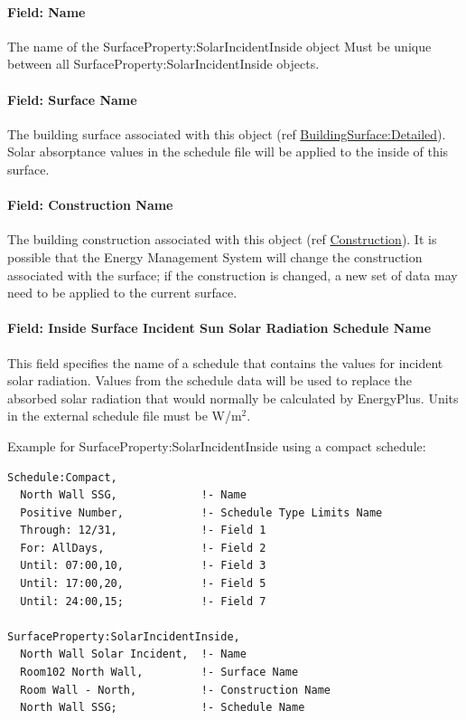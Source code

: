 \paragraph{Field: Name}\label{field-name-10}

The name of the SurfaceProperty:SolarIncidentInside object Must be unique between all SurfaceProperty:SolarIncidentInside objects.

\paragraph{Field: Surface Name}\label{field-surface-name-4}

The building surface associated with this object (ref \hyperref[buildingsurfacedetailed]{BuildingSurface:Detailed}). Solar absorptance values in the schedule file will be applied to the inside of this surface.

\paragraph{Field: Construction Name}\label{field-construction-name-1}

The building construction associated with this object (ref \hyperref[construction-000]{Construction}). It is possible that the Energy Management System will change the construction associated with the surface; if the construction is changed, a new set of data may need to be applied to the current surface.

\paragraph{Field: Inside Surface Incident Sun Solar Radiation Schedule Name}\label{field-inside-surface-incident-sun-solar-radiation-schedule-name}

This field specifies the name of a schedule that contains the values for incident solar radiation. Values from the schedule data will be used to replace the absorbed solar radiation that would normally be calculated by EnergyPlus. Units in the external schedule file must be W/m\(^{2}\).

Example for SurfaceProperty:SolarIncidentInside using a compact schedule:

\begin{lstlisting}
Schedule:Compact,
  North Wall SSG,             !- Name
  Positive Number,            !- Schedule Type Limits Name
  Through: 12/31,             !- Field 1
  For: AllDays,               !- Field 2
  Until: 07:00,10,            !- Field 3
  Until: 17:00,20,            !- Field 5
  Until: 24:00,15;            !- Field 7

SurfaceProperty:SolarIncidentInside,
  North Wall Solar Incident,  !- Name
  Room102 North Wall,         !- Surface Name
  Room Wall - North,          !- Construction Name
  North Wall SSG;             !- Schedule Name
\end{lstlisting}

